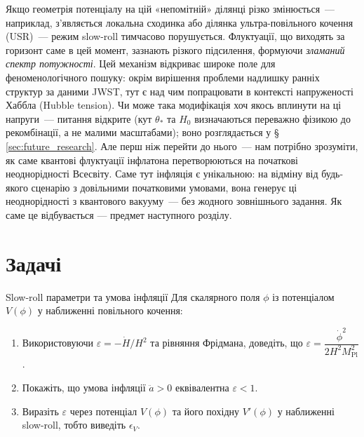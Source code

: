 Якщо геометрія потенціалу на цій «непомітній» ділянці різко
змінюється~--- наприклад, з'являється локальна сходинка або ділянка
ультра-повільного кочення (USR)~--- режим slow-roll тимчасово
порушується. Флуктуації, що виходять за горизонт саме в цей момент,
зазнають різкого підсилення, формуючи \emph{зламаний спектр
потужності}. Цей механізм відкриває широке поле для феноменологічного
пошуку: окрім вирішення проблеми надлишку ранніх структур за даними JWST,
тут є над чим попрацювати в контексті напруженості Хаббла (Hubble tension).
Чи може така модифікація хоч якось вплинути на ці напруги~--- питання відкрите
(кут $\theta_*$ та $H_0$ визначаються переважно фізикою до рекомбінації, а не малими масштабами);
воно розглядається у §\,\ref{sec:future_research}. Але перш ніж перейти
до нього~--- нам потрібно зрозуміти, як саме квантові флуктуації
інфлатона перетворюються на початкові неоднорідності Всесвіту.
Саме тут інфляція є унікальною: на відміну від будь-якого
сценарію з довільними початковими умовами, вона генерує ці
неоднорідності з квантового вакууму~--- без жодного зовнішнього
задання.
Як саме це відбувається --- предмет наступного розділу.



\section*{Задачі}

\begin{problem}{Slow-roll параметри та умова інфляції}
Для скалярного поля $\phi$ із потенціалом $V(\phi)$ у наближенні повільного кочення:

\begin{enumerate}
    \item Використовуючи $\varepsilon = -\dot{H}/H^2$ та рівняння Фрідмана,
          доведіть, що $\varepsilon = \dfrac{\dot{\phi}^2}{2H^2 M_{\mathrm{Pl}}^2}$.
    \item Покажіть, що умова інфляції $\ddot{a} > 0$ еквівалентна $\varepsilon < 1$.
    \item Виразіть $\varepsilon$ через потенціал $V(\phi)$ та його похідну $V'(\phi)$
          у наближенні slow-roll, тобто виведіть $\epsilon_V$.
\end{enumerate}
\end{problem}

